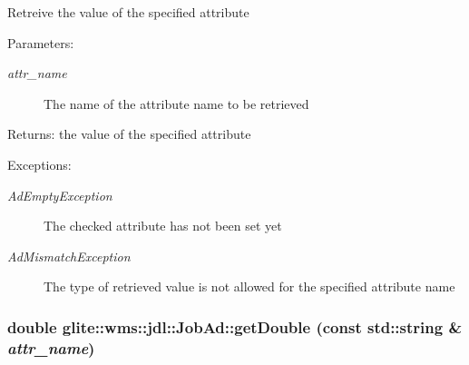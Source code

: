 Retreive the value of the specified attribute \begin{Desc}
\item[Parameters:]
\begin{description}
\item[{\em attr\_\-name}]The name of the attribute name to be retrieved \end{description}
\end{Desc}
\begin{Desc}
\item[Returns:]the value of the specified attribute \end{Desc}
\begin{Desc}
\item[Exceptions:]
\begin{description}
\item[{\em Ad\-Empty\-Exception}]The checked attribute has not been set yet \item[{\em Ad\-Mismatch\-Exception}]The type of retrieved value is not allowed for the specified attribute name \end{description}
\end{Desc}
\hypertarget{classglite_1_1wms_1_1jdl_1_1JobAd_z7_3}{
\subsubsection[getDouble]{\setlength{\rightskip}{0pt plus 5cm}double glite::wms::jdl::Job\-Ad::get\-Double (const std::string \& {\em attr\_\-name})}}
\label{classglite_1_1wms_1_1jdl_1_1JobAd_z7_3}


